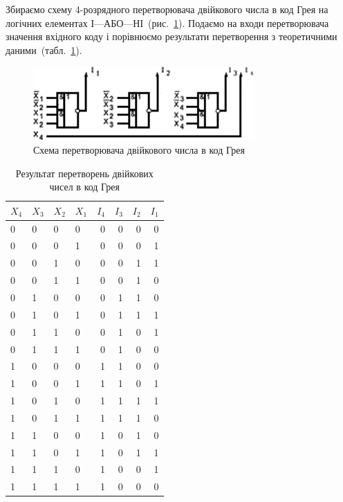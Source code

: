 \documentclass[a4paper,oneside,DIV=12,12pt,headings=normal]{scrartcl}
\begin{document}
			Збираємо схему 4-розрядного перетворювача двійкового числа в код Грея на логічних елементах І—АБО—НІ~(рис.~\ref{fig:03-binary-to-gray-code}). Подаємо на входи перетворювача значення вхідного коду і порівнюємо результати перетворення з теоретичними даними~(табл.~\ref{tab:03-binary-to-gray-code}).
			\begin{figure}[!htbp]
				\centering
				\includegraphics[width = 0.66\linewidth]{./assets/03.png}
				\caption{Схема перетворювача двійкового числа в код Грея}
				\label{fig:03-binary-to-gray-code}
			\end{figure}
			
			\begin{table}[!htbp]
				\centering
				\begin{tabular}{*{4}{l}*{4}{r}}
					\toprule
						$X_4$ & $X_3$ & $X_2$ & $X_1$ & $I_4$ & $I_3$ & $I_2$ & $I_1$ \\
					\midrule
					  0     & 0     & 0     & 0     & 0     & 0     & 0     & 0     \\
					  0     & 0     & 0     & 1     & 0     & 0     & 0     & 1     \\
					  0     & 0     & 1     & 0     & 0     & 0     & 1     & 1     \\
					  0     & 0     & 1     & 1     & 0     & 0     & 1     & 0     \\
					  0     & 1     & 0     & 0     & 0     & 1     & 1     & 0     \\
					  0     & 1     & 0     & 1     & 0     & 1     & 1     & 1     \\
					  0     & 1     & 1     & 0     & 0     & 1     & 0     & 1     \\
					  0     & 1     & 1     & 1     & 0     & 1     & 0     & 0     \\
					  1     & 0     & 0     & 0     & 1     & 1     & 0     & 0     \\
					  1     & 0     & 0     & 1     & 1     & 1     & 0     & 1     \\
					  1     & 0     & 1     & 0     & 1     & 1     & 1     & 1     \\
					  1     & 0     & 1     & 1     & 1     & 1     & 1     & 0     \\
					  1     & 1     & 0     & 0     & 1     & 0     & 1     & 0     \\
					  1     & 1     & 0     & 1     & 1     & 0     & 1     & 1     \\
					  1     & 1     & 1     & 0     & 1     & 0     & 0     & 1     \\
					  1     & 1     & 1     & 1     & 1     & 0     & 0     & 0     \\
					\bottomrule
				\end{tabular}
				\caption{Результат перетворень двійкових чисел в код Грея}
				\label{tab:03-binary-to-gray-code}
			\end{table}
\end{document}
